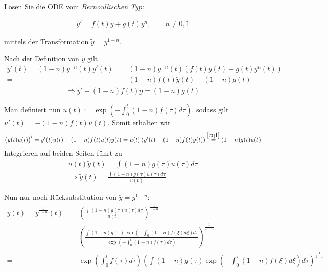 \begin{exercise}
  Lösen Sie die ODE vom \textit{Bernoullischen Typ}:

  \begin{align*}
    y' = f(t)y + g(t) y^n , \qquad n \neq 0,1
  \end{align*}

  mittels der Transformation $\tilde{y} = y^{1-n}$.
\end{exercise}

\begin{solution}
  Nach der Definition von $\tilde{y}$ gilt
  \begin{align*}
    \tilde{y}'(t) = (1-n)y^{-n}(t)y'(t) =& (1-n)y^{-n}(t)(f(t)y(t) + g(t)y^n(t)) \\
    =& (1-n)f(t)\tilde{y}(t) + (1-n)g(t)
  \end{align*}
  \begin{align}\label{eq1}
    \Rightarrow \tilde{y}' - (1-n)f(t)\tilde{y} = (1-n) g(t)
  \end{align}

  Man definiert nun $u(t) := \exp(-\int_0^t (1-n)f(\tau)d\tau)$, sodass gilt $u'(t) = -(1-n)f(t)u(t)$. Somit erhalten wir
  \begin{align*}
    \big(\tilde{y}(t)u(t)\big)' = \tilde{y}'(t)u(t) - (1-n)f(t)u(t) \tilde{y}(t)
    = u(t)\left(\tilde{y}'(t) - (1-n)f(t)\tilde{y}(t)\right)\stackrel{\eqref{eq1}}{=} (1-n)g(t)u(t)
  \end{align*}
  Integrieren auf beiden Seiten führt zu
  \begin{align*}
    u(t) \tilde{y}(t) = \int (1-n)g(\tau)u(\tau)d\tau \\
    \Rightarrow \tilde{y}(t) = \frac{\int (1-n)g(\tau)u(\tau)d\tau}{u(t)}.
  \end{align*}

  Nun nur noch Rücksubstitution von $\tilde{y} = y^{1-n}$:
  \begin{align*}
    y(t) = \tilde{y}^{\frac{1}{1-n}}(t) = & \left(\frac{\int (1-n)g(\tau)u(\tau)d\tau}{u(t)}\right)^{\frac{1}{1-n}} \\
    =& \left(\frac{\int (1-n)g(\tau) \exp\left(-\int_0^\tau (1-n)f(\xi)d\xi\right)d\tau}{\exp\left(-\int_0^t (1-n)f(\tau)d\tau\right)}\right)^{\frac{1}{1-n}} \\
    =& \exp\left(\int_0^t f(\tau)d\tau\right)\left(\int (1-n)g(\tau) \exp\left(-\int_0^\tau (1-n)f(\xi)d\xi\right)d\tau \right)^{\frac{1}{1-n}}
  \end{align*}
\end{solution}
